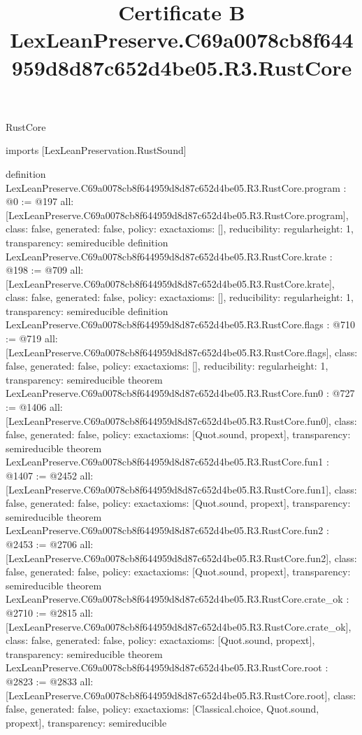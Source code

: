 \begin{lexlean}{RustCore}
\title{Certificate B LexLeanPreserve.C69a0078cb8f644959d8d87c652d4be05.R3.RustCore}
\begin{coremodule}
imports [LexLeanPreservation.RustSound]

definition LexLeanPreserve.C69a0078cb8f644959d8d87c652d4be05.R3.RustCore.program : @0 := @197 {
  all: [LexLeanPreserve.C69a0078cb8f644959d8d87c652d4be05.R3.RustCore.program],
  class: false,
  generated: false,
  policy: exact{axioms: []},
  reducibility: regular{height: 1},
  transparency: semireducible
}
definition LexLeanPreserve.C69a0078cb8f644959d8d87c652d4be05.R3.RustCore.krate : @198 := @709 {
  all: [LexLeanPreserve.C69a0078cb8f644959d8d87c652d4be05.R3.RustCore.krate],
  class: false,
  generated: false,
  policy: exact{axioms: []},
  reducibility: regular{height: 1},
  transparency: semireducible
}
definition LexLeanPreserve.C69a0078cb8f644959d8d87c652d4be05.R3.RustCore.flags : @710 := @719 {
  all: [LexLeanPreserve.C69a0078cb8f644959d8d87c652d4be05.R3.RustCore.flags],
  class: false,
  generated: false,
  policy: exact{axioms: []},
  reducibility: regular{height: 1},
  transparency: semireducible
}
theorem LexLeanPreserve.C69a0078cb8f644959d8d87c652d4be05.R3.RustCore.fun0 : @727 := @1406 {
  all: [LexLeanPreserve.C69a0078cb8f644959d8d87c652d4be05.R3.RustCore.fun0],
  class: false,
  generated: false,
  policy: exact{axioms: [Quot.sound, propext]},
  transparency: semireducible
}
theorem LexLeanPreserve.C69a0078cb8f644959d8d87c652d4be05.R3.RustCore.fun1 : @1407 := @2452 {
  all: [LexLeanPreserve.C69a0078cb8f644959d8d87c652d4be05.R3.RustCore.fun1],
  class: false,
  generated: false,
  policy: exact{axioms: [Quot.sound, propext]},
  transparency: semireducible
}
theorem LexLeanPreserve.C69a0078cb8f644959d8d87c652d4be05.R3.RustCore.fun2 : @2453 := @2706 {
  all: [LexLeanPreserve.C69a0078cb8f644959d8d87c652d4be05.R3.RustCore.fun2],
  class: false,
  generated: false,
  policy: exact{axioms: [Quot.sound, propext]},
  transparency: semireducible
}
theorem LexLeanPreserve.C69a0078cb8f644959d8d87c652d4be05.R3.RustCore.crate_ok : @2710 := @2815 {
  all: [LexLeanPreserve.C69a0078cb8f644959d8d87c652d4be05.R3.RustCore.crate_ok],
  class: false,
  generated: false,
  policy: exact{axioms: [Quot.sound, propext]},
  transparency: semireducible
}
theorem LexLeanPreserve.C69a0078cb8f644959d8d87c652d4be05.R3.RustCore.root : @2823 := @2833 {
  all: [LexLeanPreserve.C69a0078cb8f644959d8d87c652d4be05.R3.RustCore.root],
  class: false,
  generated: false,
  policy: exact{axioms: [Classical.choice, Quot.sound, propext]},
  transparency: semireducible
}


\end{coremodule}
\end{lexlean}
